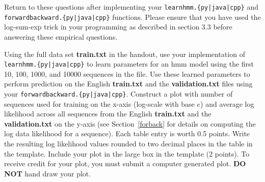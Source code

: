 \documentclass[11pt,addpoints,answers]{exam}
\begin{document}
\begin{questions}

\clearpage

\question[6] Return to these questions after implementing your \texttt{learnhmm.\{py|java|cpp\}} and \\ \texttt{forwardbackward.\{py|java|cpp\}} functions. Please ensure that you have used the log-sum-exp trick in your programming as described in section 3.3 before answering these empirical questions.

Using the full data set \textbf{train.txt} in the handout, use your implementation of\\ \texttt{learnhmm.\{py|java|cpp\}} to learn parameters for an hmm model using the first 10, 100, 1000, and 10000 sequences in the file.
Use these learned parameters to perform prediction on the English \textbf{train.txt} and the \textbf{validation.txt} files using your \texttt{forwardbackward.\{py|java|cpp\}}.
Construct a plot with number of sequences used for training on the x-axis (log-scale with base $e$) and average log likelihood across all sequences from the English \textbf{train.txt} and the \textbf{validation.txt} on the y-axis (see Section~\ref{forback} for details on computing the log data likelihood for a sequence). Each table entry is worth 0.5 points. 
Write the resulting log likelihood values rounded to two decimal places in the table in the template.
Include your plot in the large box in the template (2 points).
To receive credit for your plot, you must submit a computer generated plot.
\textbf{DO NOT} hand draw your plot.



\end{questions}
\end{document}
